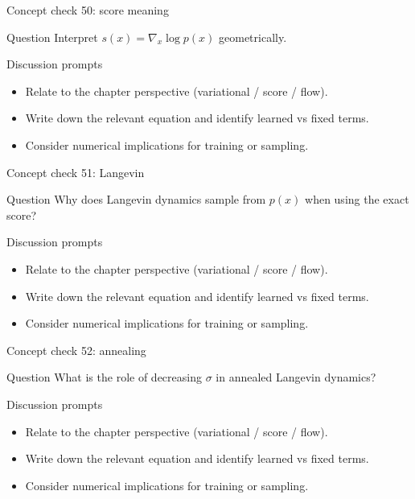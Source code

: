 \documentclass[aspectratio=169]{beamer}
\begin{document}
\begin{frame}{Concept check 50: score meaning}
\begin{block}{Question}
Interpret \(s(x)=\nabla_x\log p(x)\) geometrically.
\end{block}
\begin{block}{Discussion prompts}
\begin{itemize}
\item Relate to the chapter perspective (variational / score / flow).
\item Write down the relevant equation and identify learned vs fixed terms.
\item Consider numerical implications for training or sampling.
\end{itemize}
\end{block}
\end{frame}

\begin{frame}{Concept check 51: Langevin}
\begin{block}{Question}
Why does Langevin dynamics sample from \(p(x)\) when using the exact score?
\end{block}
\begin{block}{Discussion prompts}
\begin{itemize}
\item Relate to the chapter perspective (variational / score / flow).
\item Write down the relevant equation and identify learned vs fixed terms.
\item Consider numerical implications for training or sampling.
\end{itemize}
\end{block}
\end{frame}

\begin{frame}{Concept check 52: annealing}
\begin{block}{Question}
What is the role of decreasing \(\sigma\) in annealed Langevin dynamics?
\end{block}
\begin{block}{Discussion prompts}
\begin{itemize}
\item Relate to the chapter perspective (variational / score / flow).
\item Write down the relevant equation and identify learned vs fixed terms.
\item Consider numerical implications for training or sampling.
\end{itemize}
\end{block}
\end{frame}
\end{document}
